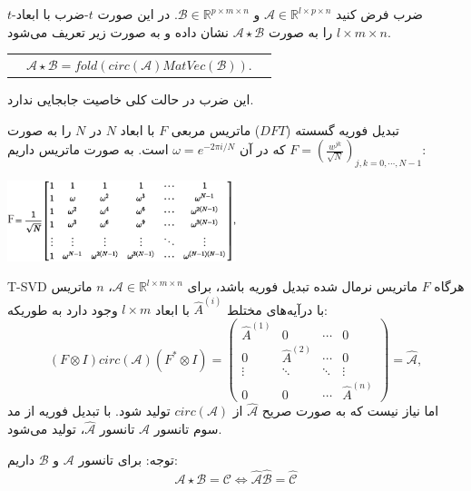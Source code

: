 \begin{frame}
\small{
\begin{alertblock}{$t$-ضرب}
	فرض کنید 
	$\mathcal{A}\in \mathbb{R}^{l\times p\times n}$
	و
	$\mathcal{B}\in \mathbb{R}^{p\times m\times n}$.
	در این صورت $t$-ضرب با ابعاد
	$l\times m\times n$
	را به صورت 
	$\mathcal{A} \star \mathcal{B}$
	نشان داده و به صورت زیر تعریف می‌شود.
	
	\begin{tabular}{p{1.3cm}cc}
		&$\mathcal{A} \star \mathcal{B}=fold\left(circ(\mathcal{A}) MatVec(\mathcal{B})\right).$
	\end{tabular}

\pause
این ضرب در حالت کلی خاصیت جابجایی ندارد.
\end{alertblock}

\pause
{}
\begin{alertblock}{تبدیل فوریه گسسته ($DFT$)}
	ماتریس مربعی $F$ با ابعاد $N$ در $N$ را به صورت
	$F=\left(\frac{w^{jk}}{\sqrt{N}}\right)_{j,k=0,\cdots,N-1}$
	که در آن
	$\omega=e^{-2\pi i/N}$ 
	است.
	 به صورت ماتریس داریم:	
	\begin{center}
		\includegraphics[width=0.5\textwidth]{img/ok/DFTW.pdf}
	\end{center}
\end{alertblock}
}
\end{frame}
\begin{frame}{T-SVD}
هرگاه $F$ ماتریس نرمال شده تبدیل فوریه باشد، برای 
$\mathcal{A}\in \mathbb{R}^{l\times m\times n}$،
$n$
ماتریس با درآیه‌های مختلط
$\hat{A}^{(i)}$
با ابعاد 
$l\times m$
وجود دارد به طوریکه:
\[(F\otimes I)circ(\mathcal{A})(F^*\otimes I)=
\begin{pmatrix}
\hat{A}^{(1)} & 0 &\cdots & 0\\
0&\hat{A}^{(2)}&\cdots & 0\\
\vdots&\ddots&\ddots&\vdots\\
0&0&\cdots&\hat{A}^{(n)}
\end{pmatrix}=\hat{\mathcal{A}},
 \]
 اما نیاز نیست که به صورت صریح
 $\hat{\mathcal{A}}$
 از 
 $circ(\mathcal{A})$
 تولید شود. با  تبدیل فوریه  از مد سوم تانسور $\mathcal{A}$
 تانسور 
  $\hat{\mathcal{A}}$،
  تولید می‌شود.
  
  \pause
  توجه: برای تانسور $\mathcal{A}$ و $\mathcal{B}$
  داریم:
  \[\mathcal{A}\star \mathcal{B}=\mathcal{C} \Longleftrightarrow \hat{\mathcal{A}}\hat{\mathcal{B}}=\hat{\mathcal{C}} \]
\end{frame}
